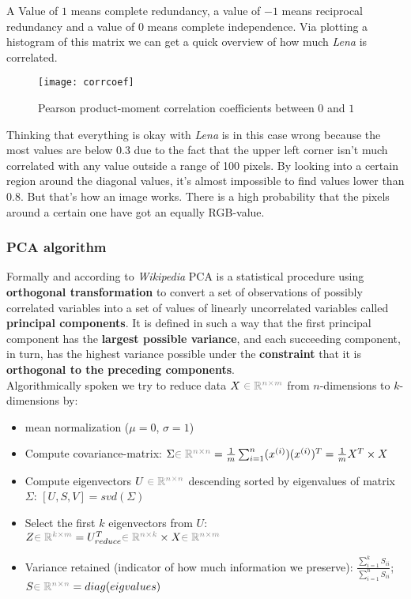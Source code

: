 \documentclass[dvipsnames,twocolumn]{scrartcl}
\begin{document}
	A Value of $1$ means complete redundancy, a value of $-1$ means reciprocal redundancy and a value of $0$ means complete independence. Via plotting a histogram of this matrix we can get a quick overview of how much \emph{Lena} is correlated.
	
	\begin{figure}
		\caption{Pearson product-moment correlation coefficients between $0$ and $1$}
		\texttt{[image: corrcoef]}
	\end{figure}
	
	Thinking that everything is okay with \emph{Lena} is in this case wrong because the most values are below $0.3$ due to the fact that the upper left corner isn't much correlated with any value outside a range of 100 pixels. By looking into a certain region around the diagonal values, it's almost impossible to find values lower than $0.8$. But that's how an image works. There is a high probability that the pixels around a certain one have got an equally RGB-value.
	
	\subsubsection{PCA algorithm}
	
	Formally and according to \emph{Wikipedia} PCA is a statistical procedure using \textbf{orthogonal transformation} to convert a set of observations of possibly correlated variables into a set of values of linearly uncorrelated variables called \textbf{principal components}. It is defined in such a way that the first principal component has the \textbf{largest possible variance}, and each succeeding component, in turn, has the highest variance possible under the \textbf{constraint} that it is \textbf{orthogonal to the preceding components}.\\
	
	
	Algorithmically spoken we try to reduce data $X \color{gray}\in \mathbb{R}^{n\times m}$ from $n$-dimensions to $k$-dimensions by:
	\begin{itemize}
		\item mean normalization ($\mu = 0$, $\sigma = 1$)
		\item Compute covariance-matrix: $\Sigma {\color{gray}\in \mathbb{R}^{n\times n}} = \frac{1}{m}\sum_{i=1}^{n}(x^{(i)})(x^{(i)})^T = \frac{1}{m}X^T\times X$
		\item Compute eigenvectors $U \color{gray}\in \mathbb{R}^{n\times n}$ descending sorted by eigenvalues of matrix $\Sigma$: $[U, S, V] = svd(\Sigma)$
		\item Select the first $k$ eigenvectors from $U$: $Z {\color{gray} \in \mathbb{R}^{k\times m}} = U_{reduce}^T {\color{gray}\in \mathbb{R}^{n\times k}}\times X {\color{gray} \in \mathbb{R}^{n\times m}}$
		\item Variance retained (indicator of how much information we preserve): $\frac{\sum_{i=1}^{k}S_{ii}}{\sum_{i=1}^{n}S_{ii}}$; $S {\color{gray} \in \mathbb{R}^{n\times n}} = diag(eigvalues)$
	\end{itemize}
	
\end{document}
